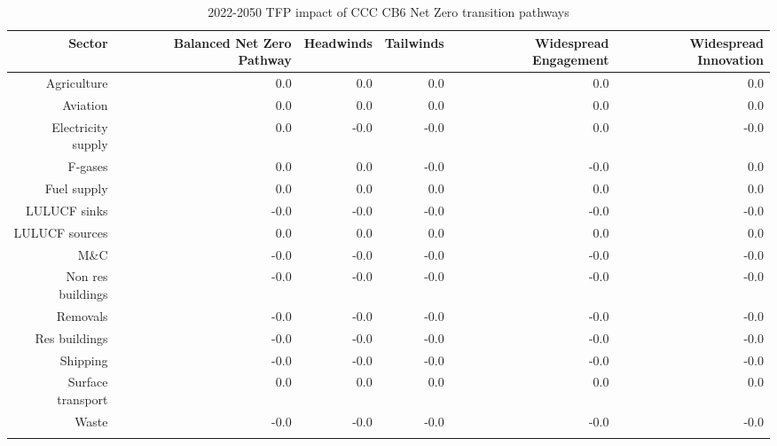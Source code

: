 \begin{longtable}{rrrrrr}
\caption{2022-2050 TFP impact of CCC CB6 Net Zero transition pathways} \\ 
  \hline
Sector & Balanced Net Zero Pathway & Headwinds & Tailwinds & Widespread Engagement & Widespread Innovation \\ 
  \hline
Agriculture & 0.0 & 0.0 & 0.0 & 0.0 & 0.0 \\ 
  Aviation & 0.0 & 0.0 & 0.0 & 0.0 & 0.0 \\ 
  Electricity supply & 0.0 & -0.0 & -0.0 & 0.0 & -0.0 \\ 
  F-gases & 0.0 & 0.0 & -0.0 & -0.0 & 0.0 \\ 
  Fuel supply & 0.0 & 0.0 & 0.0 & 0.0 & 0.0 \\ 
  LULUCF sinks & -0.0 & -0.0 & -0.0 & -0.0 & -0.0 \\ 
  LULUCF sources & 0.0 & 0.0 & 0.0 & 0.0 & 0.0 \\ 
  M\&C & -0.0 & -0.0 & -0.0 & -0.0 & -0.0 \\ 
  Non res buildings & -0.0 & -0.0 & -0.0 & -0.0 & -0.0 \\ 
  Removals & -0.0 & -0.0 & -0.0 & -0.0 & -0.0 \\ 
  Res buildings & -0.0 & -0.0 & -0.0 & -0.0 & -0.0 \\ 
  Shipping & -0.0 & -0.0 & -0.0 & -0.0 & -0.0 \\ 
  Surface transport & 0.0 & 0.0 & 0.0 & 0.0 & 0.0 \\ 
  Waste & -0.0 & -0.0 & -0.0 & -0.0 & -0.0 \\ 
   \hline
\hline
\label{tab_CCC_TFP_opex_capex}
\end{longtable}

